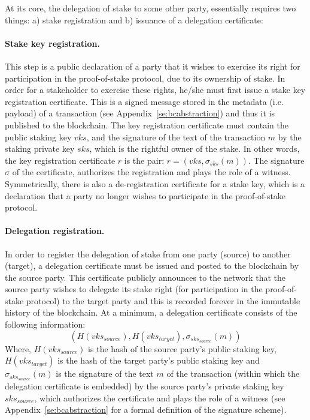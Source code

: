 \documentclass[11pt,a4paper]{article}
\begin{document}
At its core, the delegation of stake to some other party, essentially requires
two things: a) stake registration and b) issuance of a delegation certificate:

\paragraph{Stake key registration.}
This step is a public declaration of a party that it wishes to exercise its
right for participation in the proof-of-stake protocol, due to its ownership of
stake. In order for a stakeholder to exercise these rights, he/she must first
issue a stake key registration certificate. This is a signed message stored in
the metadata (i.e. payload) of a transaction (see
Appendix~\ref{se:bcabstraction}) and thus it is published to the blockchain. The
key registration certificate must contain the public staking key $vks$, and the
signature of the text of the transaction $m$ by the staking private key $sks$,
which is the rightful owner of the stake. In other words, the key registration
certificate $r$ is the pair: $r = (vks, \sigma_{sks}(m))$. The signature
$\sigma$ of the certificate, authorizes the registration and plays the role of a
witness.
%
Symmetrically, there is also a de-registration certificate for a stake key,
which is a declaration that a party no longer wishes to participate in the
proof-of-stake protocol.

\paragraph{Delegation registration.}
In order to register the delegation of stake from one party (source) to another
(target), a delegation certificate must be issued and posted to the blockchain
by the source party. This certificate publicly announces to the network that the
source party wishes to delegate its stake right (for participation in the
proof-of-stake protocol) to the target party and this is recorded forever in the
immutable history of the blockchain. At a minimum, a delegation certificate
consists of the following information:
$$
(H(vks_{source}), H(vks_{target}), \sigma_{sks_{source}}(m))
$$
Where, $H(vks_{source})$ is the hash of the source party's public staking key,
$H(vks_{target})$ is the hash of the target party's public staking key and
$\sigma_{sks_{source}}(m)$ is the signature of the text $m$ of the transaction
(within which the delegation certificate is embedded) by the source party's
private staking key $sks_{source}$, which authorizes the certificate and plays
the role of a witness (see Appendix~\ref{se:bcabstraction} for a formal
definition of the signature scheme).
\end{document}
